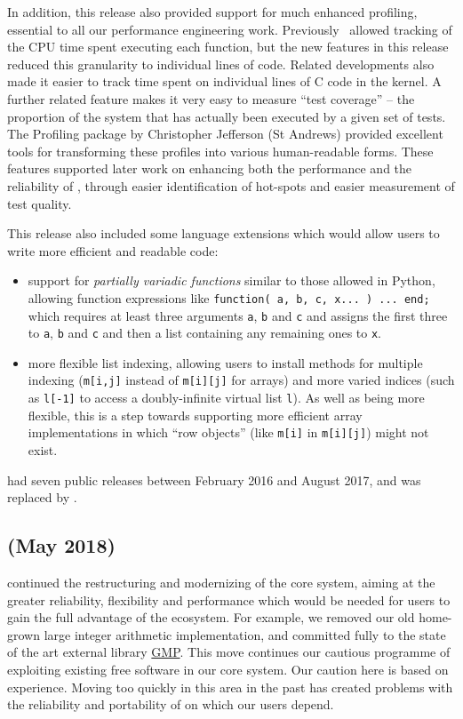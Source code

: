 \documentclass{deliverablereport}
\begin{document}
In addition, this release also provided support for much enhanced
profiling, essential to all our performance engineering work.
Previously \GAP\ allowed tracking of the CPU time spent
executing each function, but the new features in this release
reduced this granularity to individual lines of \GAP
code. Related developments also made it easier to track time spent on
individual lines of C code in the \GAP kernel. A further related
feature makes it very easy to measure ``test coverage'' -- the
proportion of the system that has actually been executed by a given
set of tests. The {\sf Profiling} package \cite{profiling} by Christopher Jefferson (St
Andrews) provided excellent tools for transforming these profiles into
various human-readable forms. These features supported later work on
enhancing both the performance and the reliability of \GAP, through
easier identification of hot-spots and easier measurement of test
quality.

This release also included some language extensions which would allow
users to write more efficient and readable code:

\begin{itemize}
  \item support for \emph{partially
  variadic functions} similar to those allowed in Python, allowing
function expressions like
\verb|function( a, b, c, x... ) ... end;|
which requires at least three arguments \verb|a|, \verb|b| and
\verb|c| and assigns the first three to \verb|a|, \verb|b| and \verb|c|
and then a list containing any remaining ones to \verb|x|.
\item more flexible list indexing, allowing users to install methods
  for multiple indexing (\verb|m[i,j]| instead of \verb|m[i][j]| for
  arrays) and more varied indices (such as \verb|l[-1]| to access a
  doubly-infinite virtual list \verb|l|). As well as being more
  flexible, this is a step towards supporting more efficient array
  implementations in which ``row objects'' (like \verb|m[i]| in
  \verb|m[i][j]|) might not exist.
\end{itemize}

 had seven public releases between February 2016 and August 2017, and
was replaced by .

\subsection{ (May 2018)}\label{gap-4.9}

 continued the restructuring and modernizing of the core \GAP
system, aiming at the greater reliability, flexibility and performance
which would be needed for \GAP users to gain the full advantage of the \ODK ecosystem.
For example, we removed our old home-grown large integer arithmetic
implementation, and committed fully to the state of the art external
library \href{???}{GMP}. This
move continues our cautious programme of exploiting existing free
software in our core system. Our caution here is based on
experience. Moving too quickly in this area in the past has created
problems with the reliability and
portability of \GAP on which our users depend.
\end{document}

